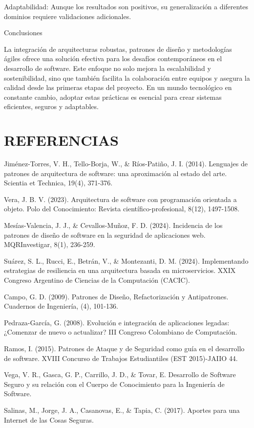 \documentclass[12pt]{article}
\begin{document}
Adaptabilidad: Aunque los resultados son positivos, su generalización a diferentes dominios requiere validaciones adicionales.

Conclusiones

La integración de arquitecturas robustas, patrones de diseño y metodologías ágiles ofrece una solución efectiva para los desafíos contemporáneos en el desarrollo de software. Este enfoque no solo mejora la escalabilidad y sostenibilidad, sino que también facilita la colaboración entre equipos y asegura la calidad desde las primeras etapas del proyecto. En un mundo tecnológico en constante cambio, adoptar estas prácticas es esencial para crear sistemas eficientes, seguros y adaptables.

\section*{REFERENCIAS}
Jiménez-Torres, V. H., Tello-Borja, W., & Ríos-Patiño, J. I. (2014). Lenguajes de patrones de arquitectura de software: una aproximación al estado del arte. Scientia et Technica, 19(4), 371-376.

Vera, J. B. V. (2023). Arquitectura de software con programación orientada a objeto. Polo del Conocimiento: Revista científico-profesional, 8(12), 1497-1508.

Mesías-Valencia, J. J., & Cevallos-Muñoz, F. D. (2024). Incidencia de los patrones de diseño de software en la seguridad de aplicaciones web. MQRInvestigar, 8(1), 236-259.

Suárez, S. L., Rucci, E., Betrán, V., & Montezanti, D. M. (2024). Implementando estrategias de resiliencia en una arquitectura basada en microservicios. XXIX Congreso Argentino de Ciencias de la Computación (CACIC).

Campo, G. D. (2009). Patrones de Diseño, Refactorización y Antipatrones. Cuadernos de Ingeniería, (4), 101-136.

Pedraza-García, G. (2008). Evolución e integración de aplicaciones legadas: ¿Comenzar de nuevo o actualizar? III Congreso Colombiano de Computación.

Ramos, I. (2015). Patrones de Ataque y de Seguridad como guía en el desarrollo de software. XVIII Concurso de Trabajos Estudiantiles (EST 2015)-JAIIO 44.

Vega, V. R., Gasca, G. P., Carrillo, J. D., & Tovar, E. Desarrollo de Software Seguro y su relación con el Cuerpo de Conocimiento para la Ingeniería de Software.

Salinas, M., Jorge, J. A., Casanovas, E., & Tapia, C. (2017). Aportes para una Internet de las Cosas Seguras.
\end{document}
